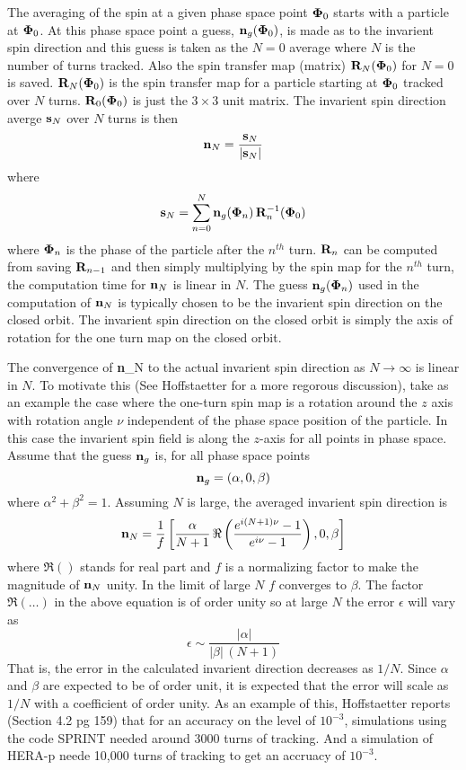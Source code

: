 \documentclass[11pt,openany]{report}
\newcommand{\Bf}[1]{{\bf #1}}
\newcommand{\bfn}{{\Bf n}}
\newcommand{\bfs}{{\Bf s}}
\newcommand{\bfR}{{\Bf R}}
\newcommand{\bfPhi}{{\Bf \Phi}}
\newcommand{\Begineq}{\begin{equation}}
\newcommand{\Endeq}{\end{equation}}
\newcommand{\Th}{$^{th}$\xspace}
\begin{document}
The averaging of the spin at a given phase space point $\bfPhi_0$ starts with a particle at
$\bfPhi_0$. At this phase space point a guess, $\bfn_g(\bfPhi_0)$, is made as to the invarient spin
direction and this guess is taken as the $N = 0$ average where $N$ is the number of turns
tracked. Also the spin transfer map (matrix) $\bfR_N(\bfPhi_0)$ for $N = 0$ is
saved. $\bfR_N(\bfPhi_0)$ is the spin transfer map for a particle starting at $\bfPhi_0$ tracked
over $N$ turns. $\bfR_0(\bfPhi_0)$ is just the $3 \times 3$ unit matrix. The invarient spin
direction averge $\bfs_N$ over $N$ turns is then
\Begineq
  \bfn_N = \frac{ \bfs_N }{ | \bfs_N | }
\Endeq
where
\Begineq
  \bfs_N = \sum_{n = 0}^N \bfn_g(\bfPhi_n) \, \bfR_n^{-1}(\bfPhi_0)
  \label{snng}
\Endeq
where $\bfPhi_n$ is the phase of the particle after the $n$\Th turn. $\bfR_n$ can be computed
from saving $\bfR_{n-1}$ and then simply multiplying by the spin map for the $n$\Th turn, the
computation time for $\bfn_N$ is linear in $N$. The guess $\bfn_g(\bfPhi_n)$ used in the computation
of $\bfn_N$ is typically chosen to be the invarient spin direction on the closed orbit. The
invarient spin direction on the closed orbit is simply the axis of rotation for the one turn map
on the closed orbit. 

The convergence of \bfn_N to the actual invarient spin direction as $N \rightarrow \infty$ is linear
in $N$. To motivate this (See Hoffstaetter for a more regorous discussion), take as an example the
case where the one-turn spin map is a rotation around the $z$ axis with rotation angle $\nu$
independent of the phase space position of the particle. In this case the invarient spin field is
along the $z$-axis for all points in phase space. Assume that the guess $\bfn_g$ is, for all phase
space points
\Begineq
  \bfn_g = (\alpha, 0, \beta)
\Endeq
where $\alpha^2 + \beta^2 = 1$. Assuming $N$ is large, the averaged invarient spin direction is
\Begineq
  \bfn_N = \frac{1}{f} \left[ \frac{\alpha}{N+1} \, 
    \Re \left( \frac{e^{i (N+1) \nu} - 1}{e^{i \nu} - 1} \right),
    0, \beta \right]
\Endeq
where $\Re()$ stands for real part and $f$ is a normalizing factor to make the magnitude of $\bfn_N$
unity. In the limit of large $N$ $f$ converges to $\beta$. The factor $\Re(\ldots)$ in the above
equation is of order unity so at large $N$ the error $\epsilon$ will vary as
\Begineq
  \epsilon \sim \frac{|\alpha|}{|\beta| \, (N+1)}
\Endeq
That is, the error in the calculated invarient direction decreases as $1/N$. Since $\alpha$ and
$\beta$ are expected to be of order unit, it is expected that the error will scale as $1/N$ with a
coefficient of order unity. As an example of this, Hoffstaetter reports (Section 4.2 pg 159) that
for an accuracy on the level of $10^{-3}$, simulations using the code SPRINT needed around 3000
turns of tracking. And a simulation of HERA-p neede 10,000 turns of tracking to get an accruacy of
$10^{-3}$.
\end{document}
